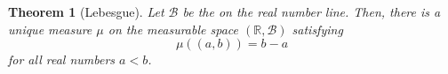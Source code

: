 \documentclass[12pt]{article}
\newtheorem*{theorem}{Theorem}
\begin{document}
\begin{theorem}[Lebesgue]
Let $\mathcal{B}$ be the  on the real number line. Then, there is a unique measure $\mu$ on the measurable space $(\mathbb{R},\mathcal{B})$ satisfying
\begin{equation*}
\mu\left( (a,b) \right) = b-a
\end{equation*}
for all real numbers $a<b$.
\end{theorem}
\end{document}
